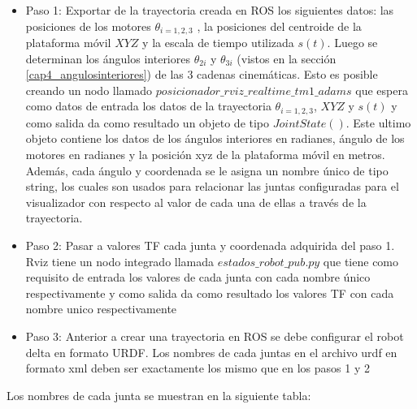         \begin{itemize}
            \item {Paso 1: Exportar de la trayectoria creada en ROS los siguientes datos: las posiciones de los motores $\theta_{i=1,2,3}$ , la posiciones del centroide de la plataforma móvil $XYZ$ y la escala de tiempo utilizada $s(t)$. Luego se determinan los ángulos interiores $\theta_{2i}$ y $\theta_{3i}$ (vistos en la sección \ref{cap4_angulosinteriores}) de las 3 cadenas cinemáticas. Esto es posible creando un nodo llamado $posicionador\_rviz\_realtime\_tm1\_adams$ que espera como datos de entrada los datos de la trayectoria  $\theta_{i=1,2,3}$, $XYZ$ y $s(t)$ y como salida da como resultado un objeto de tipo $JointState()$. Este ultimo objeto contiene los datos de los ángulos interiores en radianes, ángulo de los motores en radianes y la posición xyz de la plataforma móvil en metros. Además, cada ángulo y coordenada se le asigna un nombre único de tipo string, los cuales son usados para relacionar las juntas configuradas para el visualizador con respecto al valor de cada una de ellas a través de la trayectoria.}
            \item {Paso 2: Pasar a valores TF cada junta y coordenada adquirida del paso 1. Rviz tiene un nodo integrado llamada $estados\_robot\_pub.py$ que tiene como requisito de entrada los valores de cada junta con cada nombre único respectivamente y como salida da como resultado los valores TF con cada nombre unico respectivamente}
            \item {Paso 3: Anterior a crear una trayectoria en ROS se debe configurar el robot delta en formato URDF. Los nombres de cada juntas en el archivo urdf en formato xml deben ser exactamente los mismo que en los pasos 1 y 2}
        \end{itemize}
        

            Los nombres de cada junta se muestran en la siguiente tabla: 
            
